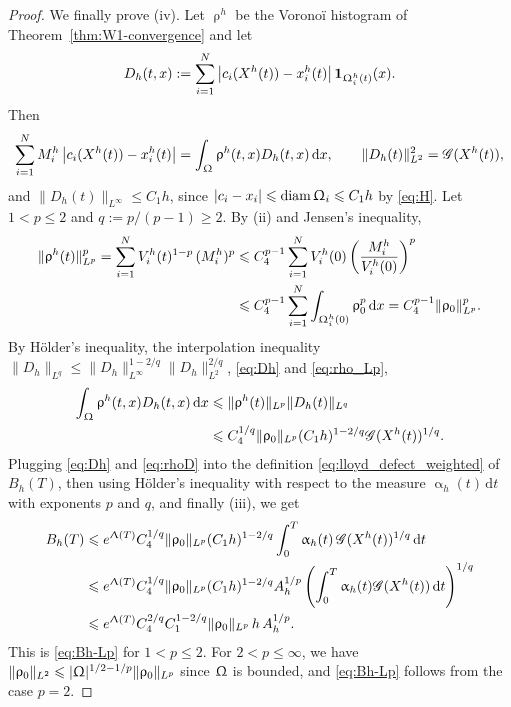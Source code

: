 \documentclass[letterpaper,11pt,twoside]{article}
\numberwithin{figure}{section}
\numberwithin{table}{section}
\theoremstyle{cpamplain}
\theoremstyle{cpamdefinition}
\newcommand{\diff}{\mathrm{d}}
\let\alpha\upalpha
\let\rho\uprho
\let\Lambda\Uplambda
\let\Omega\Upomega
\renewcommand{\le}{\leqslant}
\renewcommand{\ge}{\geqslant}
\numberwithin{equation}{section}
\begin{document}
\begin{proof}
We finally prove \textup{(iv)}.
Let $\rho^h$ be the Vorono\"i histogram of Theorem~\ref{thm:W1-convergence} and let
\[
D_h(t,x):=\sum_{i=1}^N\left|c_i(X^h(t))-x_i^h(t)\right|\mathbf 1_{\Omega_i^h(t)}(x).
\]
Then
\begin{equation}\label{eq:Dh}
\sum_{i=1}^N M_i^h\left|c_i(X^h(t))-x_i^h(t)\right|
=\int_\Omega\rho^h(t,x)D_h(t,x)\,\diff x,
\qquad
\|D_h(t)\|_{L^2}^2=\mathscr G(X^h(t)),
\end{equation}
and $\|D_h(t)\|_{L^\infty}\le C_1h$, since $|c_i-x_i|\le\operatorname{diam}\Omega_i\le C_1h$ by \eqref{eq:H}.
Let $1<p\le2$ and $q:=p/(p-1)\ge2$.
By \textup{(ii)} and Jensen's inequality,
\begin{equation}\label{eq:rho_Lp}
\begin{aligned}
\|\rho^h(t)\|_{L^p}^p
=\sum_{i=1}^N V_i^h(t)^{1-p}\,(M_i^h)^p
&\le C_4^{p-1}\sum_{i=1}^N V_i^h(0)\left(\frac{M_i^h}{V_i^h(0)}\right)^p\\
&\le C_4^{p-1}\sum_{i=1}^N\int_{\Omega_i^h(0)}\rho_0^p\,\diff x
=C_4^{p-1}\|\rho_0\|_{L^p}^p .
\end{aligned}
\end{equation}
By H\"older's inequality, the interpolation inequality $\|D_h\|_{L^q}\le\|D_h\|_{L^\infty}^{1-2/q}\|D_h\|_{L^2}^{2/q}$, \eqref{eq:Dh} and \eqref{eq:rho_Lp},
\begin{equation}\label{eq:rhoD}
\begin{aligned}
\int_\Omega\rho^h(t,x)D_h(t,x)\,\diff x
&\le\|\rho^h(t)\|_{L^p}\|D_h(t)\|_{L^q}\\
&\le C_4^{1/q}\|\rho_0\|_{L^p}(C_1h)^{1-2/q}\mathscr G(X^h(t))^{1/q} .
\end{aligned}
\end{equation}
Plugging \eqref{eq:Dh} and \eqref{eq:rhoD} into the definition \eqref{eq:lloyd_defect_weighted} of $B_h(T)$, then using H\"older's inequality with respect to the measure $\alpha_h(t)\,\diff t$ with exponents $p$ and $q$, and finally \textup{(iii)}, we get
\begin{align*}
B_h(T)
&\le e^{\Lambda(T)}C_4^{1/q}\|\rho_0\|_{L^p}(C_1h)^{1-2/q}\int_0^T\alpha_h(t)\,\mathscr G(X^h(t))^{1/q}\,\diff t\\
&\le e^{\Lambda(T)}C_4^{1/q}\|\rho_0\|_{L^p}(C_1h)^{1-2/q}A_h^{1/p}\left(\int_0^T\alpha_h(t)\mathscr G(X^h(t))\,\diff t\right)^{1/q}\\
&\le e^{\Lambda(T)}C_4^{2/q}C_1^{1-2/q}\|\rho_0\|_{L^p}\,h\,A_h^{1/p}.
\end{align*}
This is \eqref{eq:Bh-Lp} for $1<p\le2$.
For $2<p\le\infty$, we have $\|\rho_0\|_{L^2}\le|\Omega|^{1/2-1/p}\|\rho_0\|_{L^p}$ since $\Omega$ is bounded, and \eqref{eq:Bh-Lp} follows from the case $p=2$.
\end{proof}
\end{document}
